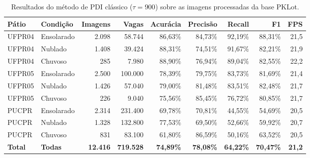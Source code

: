 \begin{table}[htbp]
\centering
\caption{Resultados do método de PDI clássico ($\tau=900$) sobre as imagens processadas da base PKLot.}
\label{tab:benchmark}
\footnotesize
\setlength{\tabcolsep}{3pt}
\begin{tabular}{llrrrrrrr}
\toprule
\textbf{Pátio} & \textbf{Condição} & \textbf{Imagens} & \textbf{Vagas} & \textbf{Acurácia} & \textbf{Precisão} & \textbf{Recall} & \textbf{F1} & \textbf{FPS} \\
\midrule
UFPR04 & Ensolarado & 2.098 & 58.744 & 86,63\% & 84,73\% & 92,19\% & 88,31\% & 21,5 \\
UFPR04 & Nublado & 1.408 & 39.424 & 88,31\% & 74,51\% & 91,67\% & 82,21\% & 21,9 \\
UFPR04 & Chuvoso & 285 & 7.980 & 88,90\% & 76,94\% & 89,04\% & 82,55\% & 22,2 \\
UFPR05 & Ensolarado & 2.500 & 100.000 & 78,39\% & 79,75\% & 83,73\% & 81,69\% & 21,4 \\
UFPR05 & Nublado & 1.426 & 57.040 & 79,00\% & 81,48\% & 83,51\% & 82,48\% & 21,7 \\
UFPR05 & Chuvoso & 226 & 9.040 & 75,56\% & 85,45\% & 76,72\% & 80,85\% & 21,7 \\
PUCPR & Ensolarado & 2.314 & 231.400 & 69,78\% & 70,81\% & 44,55\% & 54,69\% & 20,5 \\
PUCPR & Nublado & 1.328 & 132.800 & 77,53\% & 69,50\% & 52,66\% & 59,92\% & 20,7 \\
PUCPR & Chuvoso & 831 & 83.100 & 61,80\% & 86,59\% & 50,16\% & 63,52\% & 20,5 \\
\midrule
\textbf{Total} & \textbf{Todas} & \textbf{12.416} & \textbf{719.528} & \textbf{74,89\%} & \textbf{78,08\%} & \textbf{64,22\%} & \textbf{70,47\%} & \textbf{21,2} \\
\bottomrule
\end{tabular}
\end{table}

